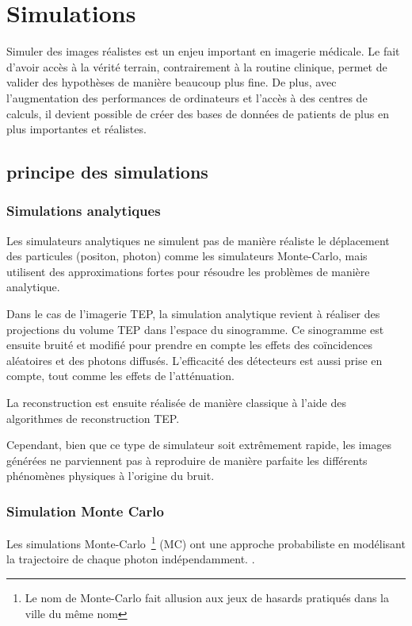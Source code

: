 \chapter{Simulations}

Simuler des images réalistes est un enjeu important en imagerie médicale. Le fait d'avoir accès à la vérité terrain, contrairement à la routine clinique, permet de valider des hypothèses de manière beaucoup plus fine. De plus, avec l'augmentation des performances de ordinateurs et l'accès à des centres de calculs, il devient possible de créer des bases de données de patients de plus en plus importantes et réalistes.


	\section{principe des simulations}

		\subsection{Simulations analytiques}

Les simulateurs analytiques ne simulent pas de manière réaliste le déplacement des particules (positon, photon) comme les simulateurs Monte-Carlo, mais  utilisent des approximations fortes pour résoudre les problèmes de manière analytique.

Dans le cas de l'imagerie TEP, la simulation analytique revient à réaliser des projections du volume TEP dans l'espace du sinogramme. Ce sinogramme est ensuite bruité et modifié pour prendre en compte les effets des coïncidences aléatoires et des photons diffusés. L'efficacité des détecteurs est aussi prise en compte, tout comme les effets de l'atténuation. 

La reconstruction est ensuite réalisée de manière classique à l'aide des algorithmes de reconstruction TEP.


Cependant, bien que ce type de simulateur soit extrêmement rapide, les images générées ne parviennent pas à reproduire de manière parfaite les différents phénomènes physiques à l'origine du bruit.

		\subsection{Simulation Monte Carlo}

Les simulations Monte-Carlo~\footnote{Le nom de Monte-Carlo fait allusion aux jeux de hasards pratiqués dans la ville du même nom} (MC) ont une approche probabiliste en modélisant la trajectoire de chaque photon indépendamment. .

